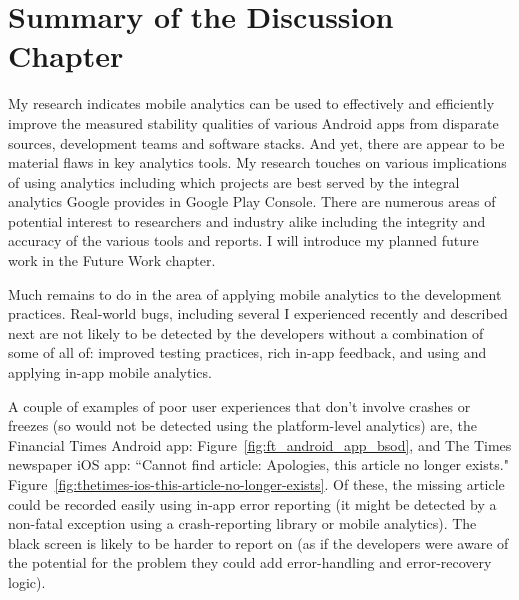 \section{Summary of the Discussion Chapter}
My research indicates mobile analytics can be used to effectively and efficiently improve the measured stability qualities of various Android apps from disparate sources, development teams and software stacks. And yet, there are appear to be material flaws in key analytics tools. My research touches on various implications of using analytics including which projects are best served by the integral analytics Google provides in Google Play Console. There are numerous areas of potential interest to researchers and industry alike including the integrity and accuracy of the various tools and reports. I will introduce my planned future work in the Future Work chapter.


Much remains to do in the area of applying mobile analytics to the development practices. Real-world bugs, including several I experienced recently and described next are not likely to be detected by the developers without a combination of some of all of: improved testing practices, rich in-app feedback, and using and applying in-app mobile analytics.

A couple of examples of poor user experiences that don't involve crashes or freezes (so would not be detected using the platform-level analytics) are, the Financial Times Android app: Figure~\ref{fig:ft_android_app_bsod}, and The Times newspaper iOS app: ``Cannot find article: Apologies, this article no longer exists." Figure~\ref{fig:thetimes-ios-this-article-no-longer-exists}. Of these, the missing article could be recorded easily using in-app error reporting (it might be detected by a non-fatal exception using a crash-reporting library or mobile analytics). The black screen is likely to be harder to report on (as if the developers were aware of the potential for the problem they could add error-handling and error-recovery logic).

